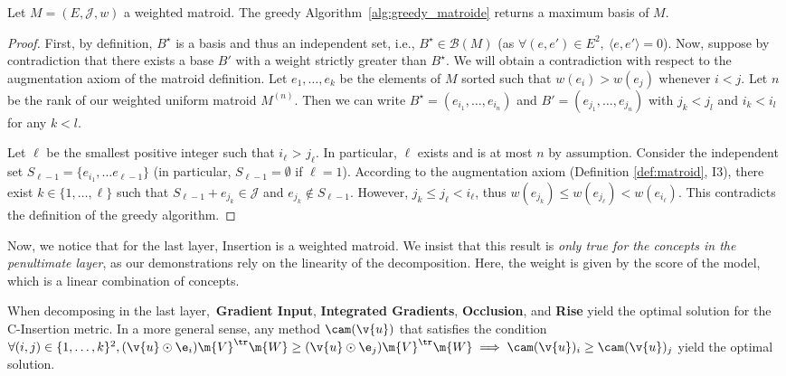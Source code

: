 \begin{theorem} Let $M = (E, \mathcal{J}, w)$ a weighted matroid. The greedy Algorithm~\ref{alg:greedy_matroide} returns a maximum basis of $M$.
\end{theorem}

\begin{proof}
First, by definition, $B^\star$ is a basis and thus an independent set, i.e., $B^\star \in \mathcal{B}(M)$ (as $\forall (e,e') \in E^2, ~ \langle e,e' \rangle = 0$).
Now, suppose by contradiction that there exists a base $B'$ with a weight strictly greater than $B^\star$. We will obtain a contradiction with respect to the augmentation axiom of the matroid definition.
Let $e_1, \ldots, e_k$ be the elements of $M$ sorted such that $w(e_i) > w(e_j)$ whenever $i < j$. 
Let $n$ be the rank of our weighted uniform matroid $M^{(n)}$. 
Then we can write $B^\star = (e_{i_1}, \ldots, e_{i_n})$ and $B' = (e_{j_1}, \ldots, e_{j_n})$ with $j_k < j_l$ and $i_k < i_l$ for any $k < l$.

Let $\ell$ be the smallest positive integer such that $i_\ell$ > $j_\ell$. In particular, $\ell$ exists and is at most $n$ by assumption. Consider the independent set $S_{\ell-1} = \{e_{i_1}, \ldots e_{\ell-1}\}$ (in particular, $S_{\ell-1} = \emptyset$ if $\ell =1$). According to the augmentation axiom (Definition \ref{def:matroid}, I3), there exist $k \in \{1, \ldots, \ell \}$ such that $S_{\ell-1} + e_{j_k} \in \mathcal{J}$ and $e_{j_k} \notin S_{\ell-1}$. However, $j_k \leq j_\ell < i_\ell$, thus $w(e_{j_k}) \leq w(e_{j_\ell}) <w(e_{i_\ell})$. This contradicts the definition of the greedy algorithm.
\end{proof}

Now, we notice that for the last layer, Insertion is a weighted matroid. We insist that this result is \emph{only true for the concepts in the penultimate layer}, as our demonstrations rely on the linearity of the decomposition. Here, the weight is given by the score of the model, which is a linear combination of concepts.  


\begin{theorem}
When decomposing in the last layer,~\textbf{Gradient Input}, \textbf{Integrated Gradients}, \textbf{Occlusion}, and \textbf{Rise} yield the optimal solution for the C-Insertion metric.
In a more general sense, any method $\cam(\v{u})$ that  satisfies the condition 
$\forall (i, j) \in \{1, \ldots, k\}^2, 
(\v{u} \odot \e_i) \m{V}^\tr\m{W} \geq (\v{u} \odot \e_j) \m{V}^\tr \m{W}
\implies 
\cam(\v{u})_i \geq \cam(\v{u})_j 
$ yield the optimal solution.
\end{theorem}

